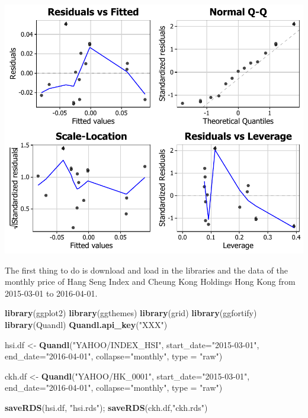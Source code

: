 \documentclass[]{article}
\newenvironment{Shaded}{\begin{snugshade}}{\end{snugshade}}
\newcommand{\KeywordTok}[1]{\textcolor[rgb]{0.13,0.29,0.53}{\textbf{{#1}}}}
\newcommand{\DataTypeTok}[1]{\textcolor[rgb]{0.13,0.29,0.53}{{#1}}}
\newcommand{\StringTok}[1]{\textcolor[rgb]{0.31,0.60,0.02}{{#1}}}
\newcommand{\NormalTok}[1]{{#1}}
\begin{document}
\begin{center}\includegraphics{11_Linear_Regression_Plot_pdf/lr_final-2} \end{center}

The first thing to do is download and load in the libraries and the data
of the monthly price of Hang Seng Index and Cheung Kong Holdings Hong
Kong from 2015-03-01 to 2016-04-01.

\begin{Shaded}
\begin{Highlighting}[]
\KeywordTok{library}\NormalTok{(ggplot2)}
\KeywordTok{library}\NormalTok{(ggthemes)}
\KeywordTok{library}\NormalTok{(grid) }
\KeywordTok{library}\NormalTok{(ggfortify)}
\KeywordTok{library}\NormalTok{(Quandl)}
\KeywordTok{Quandl.api_key}\NormalTok{(}\StringTok{"XXX"}\NormalTok{)}

\NormalTok{hsi.df <-}\StringTok{ }\KeywordTok{Quandl}\NormalTok{(}\StringTok{"YAHOO/INDEX_HSI"}\NormalTok{, }\DataTypeTok{start_date=}\StringTok{"2015-03-01"}\NormalTok{, }\DataTypeTok{end_date=}\StringTok{"2016-04-01"}\NormalTok{,}
    \DataTypeTok{collapse=}\StringTok{"monthly"}\NormalTok{, }\DataTypeTok{type =} \StringTok{"raw"}\NormalTok{)}

\NormalTok{ckh.df <-}\StringTok{ }\KeywordTok{Quandl}\NormalTok{(}\StringTok{"YAHOO/HK_0001"}\NormalTok{, }\DataTypeTok{start_date=}\StringTok{"2015-03-01"}\NormalTok{, }
    \DataTypeTok{end_date=}\StringTok{"2016-04-01"}\NormalTok{, }\DataTypeTok{collapse=}\StringTok{"monthly"}\NormalTok{, }\DataTypeTok{type =} \StringTok{"raw"}\NormalTok{)}

\KeywordTok{saveRDS}\NormalTok{(hsi.df, }\StringTok{"hsi.rds"}\NormalTok{); }\KeywordTok{saveRDS}\NormalTok{(ckh.df,}\StringTok{"ckh.rds"}\NormalTok{)}
\end{Highlighting}
\end{Shaded}
\end{document}
